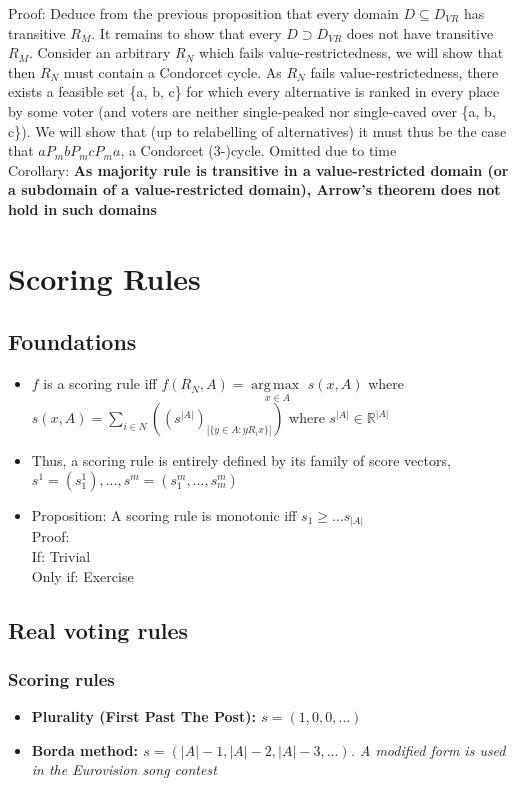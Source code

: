 \documentclass[20pt,a4paper,landscape]{extarticle}
\DeclareMathOperator*{\argmax}{arg\,max\:}
\begin{document}
\begin{flushleft}
\begin{itemize}
Proof: Deduce from the previous proposition that every domain $D \subseteq D_{VR}$ has transitive $R_M$. It remains to show that every $D \supset D_{VR}$ does not have transitive $R_M$.
\clearpage
Consider an arbitrary $R_N$ which fails value-restrictedness, we will show that then $R_N$ must contain a Condorcet cycle. As $R_N$ fails value-restrictedness, there exists a feasible set \{a, b, c\} for which every alternative is ranked in every place by some voter (and voters are neither single-peaked nor single-caved over \{a, b, c\}). We will show that (up to relabelling of alternatives) it must thus be the case that $a P_m b P_m c P_m a$, a Condorcet (3-)cycle. Omitted due to time\\
Corollary: \textbf{As majority rule is transitive in a value-restricted domain (or a subdomain of a value-restricted domain), Arrow's theorem does not hold in such domains}
\end{itemize}
\clearpage
\section{Scoring Rules}
\subsection{Foundations}
\begin{itemize}
\item $f$ is a scoring rule iff $f(R_N, A) = \underset{x \in A}{\argmax}s(x, A)$ where $s(x, A) = \sum_{i \in N} \left((s^{|A|})_{|\{y \in A: yR_ix\}|}\right)$ where $s^{|A|} \in \mathbb{R}^{|A|}$
\item Thus, a scoring rule is entirely defined by its family of score vectors, $s^1 = (s^1_1), ..., s^m = (s_1^m, ..., s_m^m)$
\item Proposition: A scoring rule is monotonic iff $s_1 \geq ... s_{|A|}$\\
Proof:\\
If: Trivial\\
Only if: Exercise
\end{itemize}
\clearpage
\subsection{Real voting rules}
\subsubsection{Scoring rules}
\begin{itemize}
\item \textbf{Plurality (First Past The Post): $s = (1, 0, 0, ...)$}
\item \textbf{Borda method: $s = (|A|-1, |A|-2, |A|-3, ...)$}\textit{. A modified form is used in the Eurovision song contest}
\end{itemize}

\end{flushleft}
\end{document}
